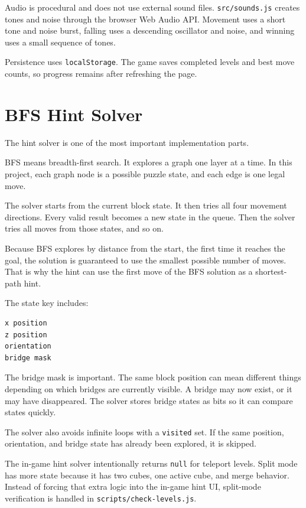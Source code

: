\documentclass[11pt,a4paper]{article}
\newcommand{\code}[1]{\texttt{#1}}
\begin{document}
Audio is procedural and does not use external sound files. \code{src/sounds.js} creates tones and noise through the browser Web Audio API. Movement uses a short tone and noise burst, falling uses a descending oscillator and noise, and winning uses a small sequence of tones.

Persistence uses \code{localStorage}. The game saves completed levels and best move counts, so progress remains after refreshing the page.

\section{BFS Hint Solver}

The hint solver is one of the most important implementation parts.

BFS means breadth-first search. It explores a graph one layer at a time. In this project, each graph node is a possible puzzle state, and each edge is one legal move.

The solver starts from the current block state. It then tries all four movement directions. Every valid result becomes a new state in the queue. Then the solver tries all moves from those states, and so on.

Because BFS explores by distance from the start, the first time it reaches the goal, the solution is guaranteed to use the smallest possible number of moves. That is why the hint can use the first move of the BFS solution as a shortest-path hint.

The state key includes:

\begin{lstlisting}
x position
z position
orientation
bridge mask
\end{lstlisting}

The bridge mask is important. The same block position can mean different things depending on which bridges are currently visible. A bridge may now exist, or it may have disappeared. The solver stores bridge states as bits so it can compare states quickly.

The solver also avoids infinite loops with a \code{visited} set. If the same position, orientation, and bridge state has already been explored, it is skipped.

The in-game hint solver intentionally returns \code{null} for teleport levels. Split mode has more state because it has two cubes, one active cube, and merge behavior. Instead of forcing that extra logic into the in-game hint UI, split-mode verification is handled in \code{scripts/check-levels.js}.
\end{document}
